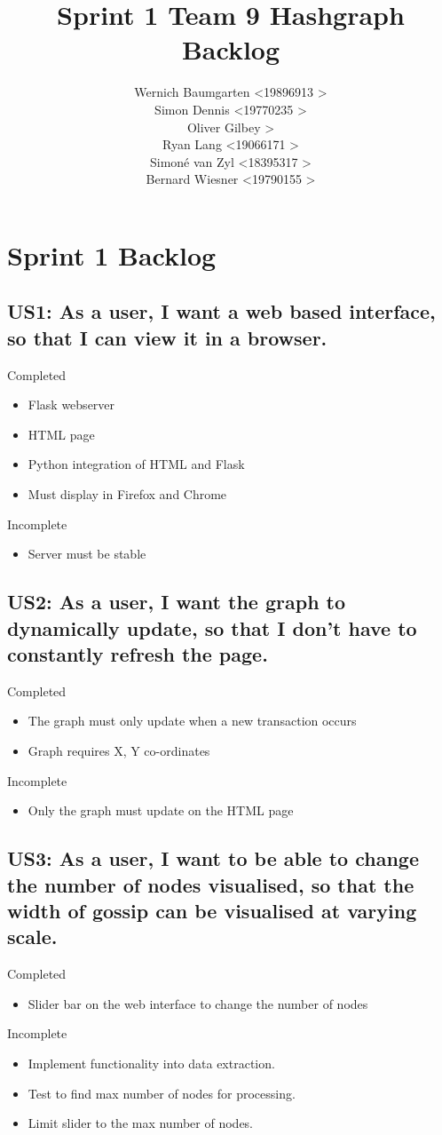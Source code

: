 \documentclass[a4paper,10pt]{article}
\title{Sprint 1 Team 9 Hashgraph Backlog}
\author{Wernich Baumgarten \textless 19896913 \textgreater \\
	Simon Dennis \textless 19770235 \textgreater  \\
	Oliver Gilbey \testless 17839688 \textgreater  \\
	Ryan Lang \textless 19066171 \textgreater  \\
	Simon\'e van Zyl \textless 18395317 \textgreater  \\
	Bernard Wiesner \textless 19790155 \textgreater}
\date{}
\begin{document}
\maketitle
\section{Sprint 1 Backlog}
\subsection{US1: As a user, I want a web based interface, so that I can view it in a browser.}
Completed
\begin{itemize}
 \item Flask webserver
 \item HTML page
 \item Python integration of HTML and Flask
 \item Must display in Firefox and Chrome
\end{itemize}
Incomplete
\begin{itemize}
 \item Server must be stable
\end{itemize}

\subsection{US2: As a user, I want the graph to dynamically update, so that I don’t have to constantly refresh the page.}
Completed
\begin{itemize}
 \item The graph must only update when a new transaction occurs
 \item Graph requires X, Y co-ordinates
\end{itemize}
Incomplete
\begin{itemize}
 \item Only the graph must update on the HTML page
\end{itemize}

\subsection{US3: As a user, I want to be able to change the number of nodes visualised, so that the width of gossip can be visualised at varying scale.}
Completed
\begin{itemize}
 \item Slider bar on the web interface to change the number of nodes
\end{itemize}
Incomplete
\begin{itemize}
 \item Implement functionality into data extraction.
 \item Test to find max number of nodes for processing.
 \item Limit slider to the max number of nodes.
\end{itemize}
\end{document}
